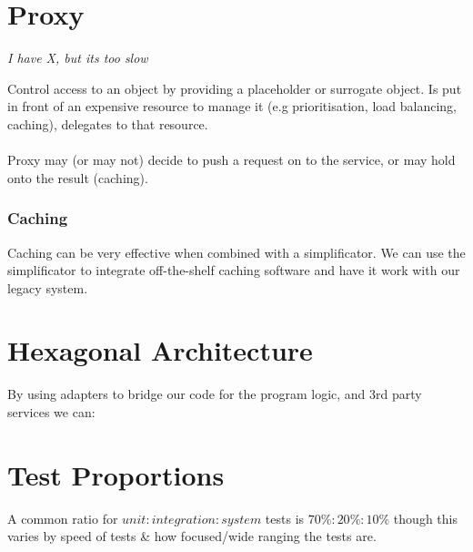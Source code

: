 \documentclass{report}
\begin{document}
\section*{Proxy}
\centerline{\textit{I have X, but its too slow}}
Control access to an object by providing a placeholder or surrogate object. Is put in front of an expensive resource to manage it (e.g prioritisation, load balancing, caching), delegates to that resource.
\\
\\ Proxy may (or may not) decide to push a request on to the service, or may hold onto the result (caching).
\subsubsection*{Caching}
Caching can be very effective when combined with a simplificator. We can use the simplificator to integrate off-the-shelf caching software and have it work with our legacy system.

\section*{Hexagonal Architecture}
By using adapters to bridge our code for the program logic, and 3rd party services we can:
\begin{itemize}
\end{itemize}

\section*{Test Proportions}
A common ratio for $unit : integration : system$ tests is $70\% : 20\% : 10\%$ though this varies by speed of tests \& how focused/wide ranging the tests are.
\end{document}
